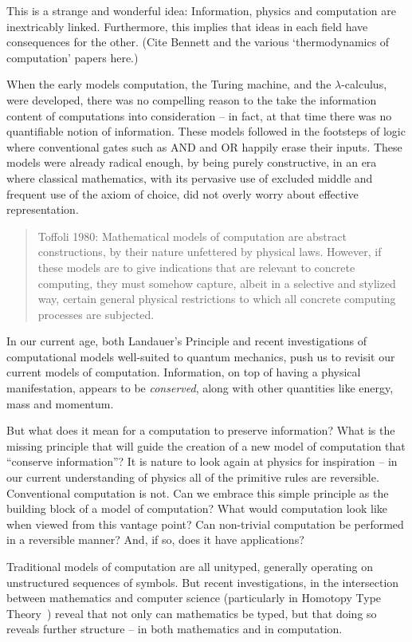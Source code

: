 \documentclass{article}
\begin{document}
This is a strange and wonderful idea: Information,
physics and computation are inextricably linked. Furthermore, this
implies that ideas in each field have consequences for the other.
(Cite Bennett and the various `thermodynamics of computation' papers here.)

When the early models computation, the Turing machine, and the
$\lambda$-calculus, were developed, there was no compelling reason to the
take the information content of computations into
consideration -- in fact, at that time there was no quantifiable
notion of information. These models followed in the footsteps of logic
where conventional gates such as AND and OR happily erase their
inputs. These models were already radical enough, by being purely
constructive, in an era where classical mathematics, with its
pervasive use of excluded middle and frequent use of the axiom of
choice, did not overly worry about effective representation.

\begin{quote}
Toffoli 1980: Mathematical models of computation are abstract
constructions, by their nature unfettered by physical laws. However,
if these models are to give indications that are relevant to concrete
computing, they must somehow capture, albeit in a selective and
stylized way, certain general physical restrictions to which all
concrete computing processes are subjected.
\end{quote}

In our current age, both Landauer's Principle and recent investigations
of computational models well-suited to quantum mechanics, push us to
revisit our current models of computation. Information, on top of
having a physical manifestation, appears to be \emph{conserved},
along with other quantities like energy, mass and momentum.

But what does it mean for a computation to preserve information?
What is the missing principle that will guide the creation of a new
model of computation that ``conserve information''?
It is nature to look again at physics for inspiration --
in our current understanding of physics all of the primitive rules
are reversible. Conventional computation is not. Can
we embrace this simple principle as the building block of a model of
computation? What would computation look like when viewed from this
vantage point? Can non-trivial computation be performed in a
reversible manner? And, if so, does it have applications?

Traditional models of computation are all unityped, generally
operating on unstructured sequences of symbols. But recent
investigations, in the intersection between mathematics and
computer science (particularly in Homotopy Type Theory~\cite{hott-book})
reveal that not only can mathematics be typed, but that doing so
reveals further structure -- in both mathematics and in computation.
\end{document}
